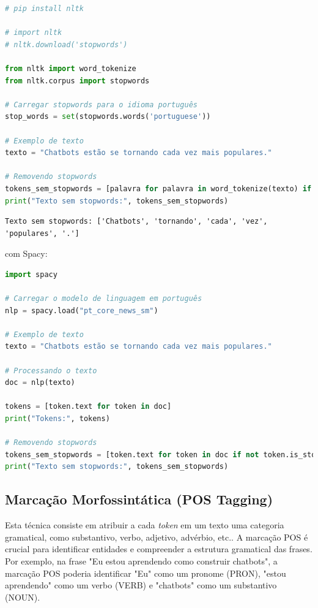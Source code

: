 \documentclass[14pt,a4paper,oneside]{book}
\begin{document}
\begin{lstlisting}[language=Python]
# pip install nltk

# import nltk
# nltk.download('stopwords')

from nltk import word_tokenize
from nltk.corpus import stopwords

# Carregar stopwords para o idioma português
stop_words = set(stopwords.words('portuguese'))

# Exemplo de texto
texto = "Chatbots estão se tornando cada vez mais populares."

# Removendo stopwords
tokens_sem_stopwords = [palavra for palavra in word_tokenize(texto) if palavra.lower() not in stop_words]
print("Texto sem stopwords:", tokens_sem_stopwords)
\end{lstlisting}

\begin{lstlisting}
Texto sem stopwords: ['Chatbots', 'tornando', 'cada', 'vez', 'populares', '.']
\end{lstlisting}

com Spacy: \\

\begin{lstlisting}[language=Python]
import spacy

# Carregar o modelo de linguagem em português
nlp = spacy.load("pt_core_news_sm")

# Exemplo de texto
texto = "Chatbots estão se tornando cada vez mais populares."

# Processando o texto
doc = nlp(texto)

tokens = [token.text for token in doc]
print("Tokens:", tokens)

# Removendo stopwords
tokens_sem_stopwords = [token.text for token in doc if not token.is_stop]
print("Texto sem stopwords:", tokens_sem_stopwords)
\end{lstlisting}
	
\subsection{Marcação Morfossintática (POS Tagging)}

Esta técnica consiste em atribuir a cada \textit{token} em um texto uma categoria gramatical, como substantivo, verbo, adjetivo, advérbio, etc.. A marcação POS é crucial para identificar entidades e compreender a estrutura gramatical das frases. Por exemplo, na frase "Eu estou aprendendo como construir chatbots", a marcação POS poderia identificar "Eu" como um pronome (PRON), "estou aprendendo" como um verbo (VERB) e "chatbots" como um substantivo (NOUN).
\end{document}
